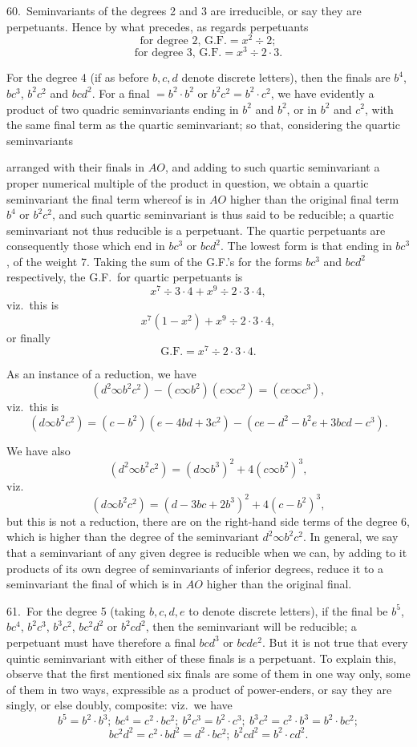 \documentclass[11pt]{article}
\begin{document}
60.\ Seminvariants of the degrees 2 and 3 are irreducible, or say they are perpetuants. Hence by what precedes, as regards perpetuants
\[
\text{for degree 2, G.F.}= x^2 \div 2;
\]
\[
\text{for degree 3, G.F.}= x^3 \div 2 \cdot 3.
\]

For the degree 4 (if as before $b, c, d$ denote discrete letters), then the finals are $b^4$, $bc^3$, $b^2c^2$ and $bcd^2$. For a final $= b^2 \cdot b^2$ or $b^2c^2 = b^2 \cdot c^2$, we have evidently a product of two quadric seminvariants ending in $b^2$ and $b^2$, or in $b^2$ and $c^2$, with the same final term as the quartic seminvariant; so that, considering the quartic seminvariants

\clearpage
arranged with their finals in $AO$, and adding to such quartic seminvariant a proper numerical multiple of the product in question, we obtain a quartic seminvariant the final term whereof is in $AO$ higher than the original final term $b^4$ or $b^2c^2$, and such quartic seminvariant is thus said to be reducible; a quartic seminvariant not thus reducible is a perpetuant. The quartic perpetuants are consequently those which end in $bc^3$ or $bcd^2$. The lowest form is that ending in $bc^3$, of the weight 7. Taking the sum of the G.F.'s for the forms $bc^3$ and $bcd^2$ respectively, the G.F.\ for quartic perpetuants is
\[
x^7 \div 3 \cdot 4 + x^9 \div 2 \cdot 3 \cdot 4,
\]
viz.\ this is
\[
x^7 (1 - x^2) + x^9 \div 2 \cdot 3 \cdot 4,
\]
or finally
\[
\text{G.F.}= x^7 \div 2 \cdot 3 \cdot 4.
\]

As an instance of a reduction, we have
\[
(d^2 \infty b^2c^2) - (c \infty b^2)(e \infty c^2) = (ce \infty c^3),
\]
viz.\ this is
\[
(d \infty b^2c^2) = (c - b^2)(e - 4bd + 3c^2) - (ce - d^2 - b^2e + 3bcd - c^3).
\]

We have also
\[
(d^2 \infty b^2c^2) = (d \infty b^3)^2 + 4(c \infty b^2)^3,
\]
viz.
\[
(d \infty b^2c^2) = (d - 3bc + 2b^3)^2 + 4(c - b^2)^3,
\]
but this is not a reduction, there are on the right-hand side terms of the degree 6, which is higher than the degree of the seminvariant $d^2 \infty b^2c^2$. In general, we say that a seminvariant of any given degree is reducible when we can, by adding to it products of its own degree of seminvariants of inferior degrees, reduce it to a seminvariant the final of which is in $AO$ higher than the original final.

61.\ For the degree 5 (taking $b, c, d, e$ to denote discrete letters), if the final be $b^5$, $bc^4$, $b^2c^3$, $b^3c^2$, $bc^2d^2$ or $b^2cd^2$, then the seminvariant will be reducible; a perpetuant must have therefore a final $bcd^3$ or $bcde^2$. But it is not true that every quintic seminvariant with either of these finals is a perpetuant. To explain this, observe that the first mentioned six finals are some of them in one way only, some of them in two ways, expressible as a product of power-enders, or say they are singly, or else doubly, composite: viz.\ we have
\[
b^5 = b^2 \cdot b^3;\ bc^4 = c^2 \cdot bc^2;\ b^2c^3 = b^2 \cdot c^3;\ b^3c^2 = c^2 \cdot b^3 = b^2 \cdot bc^2;
\]
\[
bc^2d^2 = c^2 \cdot bd^2 = d^2 \cdot bc^2;\ b^2cd^2 = b^2 \cdot cd^2.
\]
\end{document}

